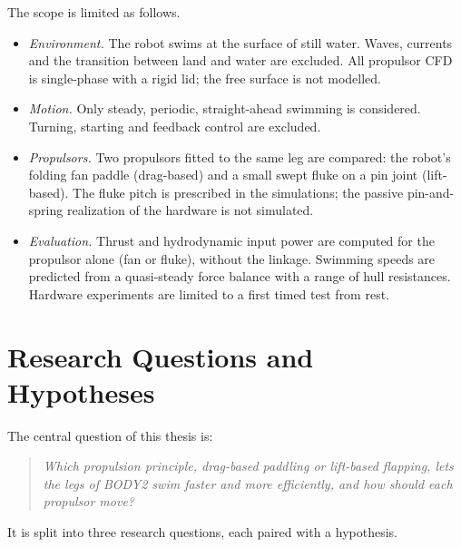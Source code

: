The scope is limited as follows.
\begin{itemize}
  \item \emph{Environment.} The robot swims at the surface of still water. Waves, currents and the transition
        between land and water are excluded. All propulsor CFD is single-phase with a rigid lid; the free surface is
        not modelled.
  \item \emph{Motion.} Only steady, periodic, straight-ahead swimming is considered. Turning, starting and
        feedback control are excluded.
  \item \emph{Propulsors.} Two propulsors fitted to the same leg are compared: the robot's folding fan paddle
        (drag-based) and a small swept fluke on a pin joint (lift-based). The fluke pitch is prescribed in
        the simulations; the passive pin-and-spring realization of the hardware is not simulated.
  \item \emph{Evaluation.} Thrust and hydrodynamic input power are computed for the propulsor alone (fan or
        fluke), without the linkage. Swimming speeds are predicted from a quasi-steady force balance with a
        range of hull resistances. Hardware experiments are limited to a first timed test from rest.
\end{itemize}

\section{Research Questions and Hypotheses}

The central question of this thesis is:
\begin{quote}
\itshape Which propulsion principle, drag-based paddling or lift-based flapping, lets the legs of BODY2 swim
faster and more efficiently, and how should each propulsor move?
\end{quote}
It is split into three research questions, each paired with a hypothesis.

